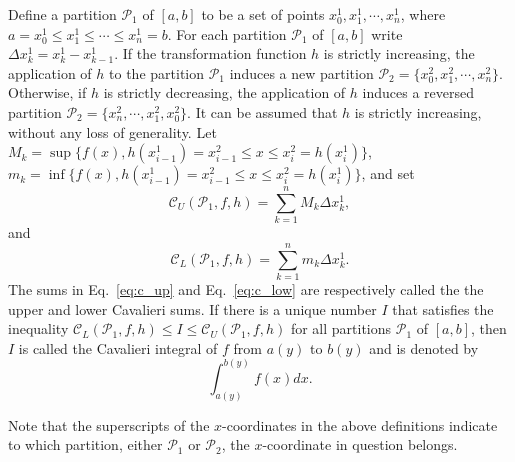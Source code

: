 \documentclass[twoside,reqno,11pt]{fcaa-var} %
\begin{document}
\begin{definition}\label{def:cav_integral}
Define a partition $\mathcal{P}_1$ of $[a,b]$ to be a set of points $x_0^1, x_1^1,\cdots,x_n^1$, 
where $a = x_0^1 \leq x_1^1 \leq \cdots \leq x_n^1 = b$. For each partition 
$\mathcal{P}_1$ of $[a,b]$ write $\Delta x_k^1 = x_k^1-x_{k-1}^1$. 
If the transformation function $h$ is strictly increasing,
the application of $h$ to the partition $\mathcal{P}_1$ induces a new partition $\mathcal{P}_2 = \{x_0^2, x_1^2,\cdots, x_n^2\}$.
Otherwise, if $h$ is strictly decreasing, the application of $h$ induces a reversed partition $\mathcal{P}_2 = \{x_n^2, \cdots, x_1^2,x_0^2\}$. It
can be assumed that $h$ is strictly increasing, without any loss of generality.  Let 
$M_k = \sup \{f (x), h(x_{i-1}^1) = x_{i-1}^2 \leq x \leq x_i^2 = h(x_i^1)\}$, $m_k = \inf \{f (x), h(x_{i-1}^1) = x_{i-1}^2 \leq x \leq x_i^2 = h(x_i^1)\}$, and set 
\begin{equation}
\label{eq:c_up}
\mathcal{C}_U(\mathcal{P}_1,f,h) = \sum_{k=1}^n M_k \Delta x_k^1, 
\end{equation}
and
\begin{equation}
\label{eq:c_low}
\mathcal{C}_L(\mathcal{P}_1,f,h) = \sum_{k=1}^n m_k \Delta x_k^1. 
\end{equation}
The sums in Eq.~\eqref{eq:c_up} and Eq.~\eqref{eq:c_low} are respectively called the the upper and lower Cavalieri sums.
If there is a unique number $I$ that satisfies the inequality $\mathcal{C}_L(\mathcal{P}_1,f,h)\leq I \leq \mathcal{C}_U(\mathcal{P}_1,f,h)$ for all 
partitions $\mathcal{P}_1$ of $[a,b]$, then $I$ is called the Cavalieri integral of $f$ from $a(y)$ to $b(y)$ and is denoted by
\begin{equation}
\int_{a(y)}^{b(y)} f(x) dx.
\end{equation}
\end{definition}

Note that the superscripts of the $x$-coordinates in the above definitions indicate to which partition, either $\mathcal{P}_1$ or $\mathcal{P}_2$, the $x$-coordinate in question belongs.
\end{document}
